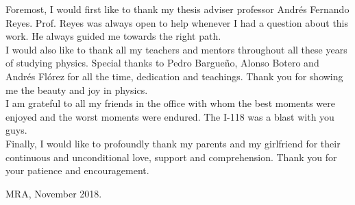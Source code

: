 
Foremost, I would first like to thank my thesis adviser professor Andrés Fernando Reyes. Prof. Reyes was always open to help whenever I had a question about this work. He always guided me towards the right path. \\

I would also like to thank all my teachers and mentors throughout all these years of studying physics. Special thanks to Pedro Bargueño, Alonso Botero and Andrés Flórez for all the time, dedication and teachings. Thank you for showing me the beauty and joy in physics.\\

I am grateful to all my friends in the office with whom the best moments were enjoyed and the worst moments were endured. The I-118 was a blast with you guys.\\

Finally, I would like to profoundly thank my parents and my girlfriend for their continuous and unconditional love, support and comprehension. Thank you for your patience and encouragement. \\[2ex]

\begin{flushright}
	MRA, November 2018.
\end{flushright}